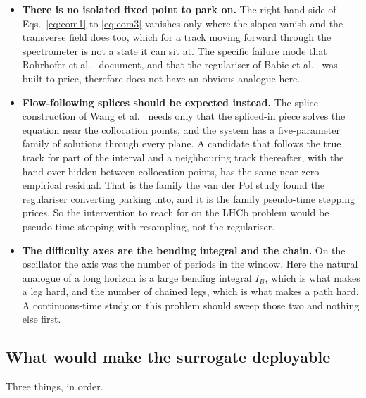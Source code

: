 \documentclass[11pt,a4paper]{article}
\begin{document}
\begin{itemize}
  \item \textbf{There is no isolated fixed point to park on.} The right-hand
  side of Eqs.~\eqref{eq:eom1} to \eqref{eq:eom3} vanishes only where the slopes
  vanish and the transverse field does too, which for a track moving forward
  through the spectrometer is not a state it can sit at. The specific failure
  mode that Rohrhofer et al.~\cite{rohrhofer2023} document, and that the
  regulariser of Babic et al.~\cite{babic2025} was built to price, therefore
  does not have an obvious analogue here.
  \item \textbf{Flow-following splices should be expected instead.} The splice
  construction of Wang et al.~\cite{wang2026pseudo} needs only that the
  spliced-in piece solves the equation near the collocation points, and the
  system has a five-parameter family of solutions through every plane. A
  candidate that follows the true track for part of the interval and a
  neighbouring track thereafter, with the hand-over hidden between collocation
  points, has the same near-zero empirical residual. That is the family the van
  der Pol study found the regulariser converting parking into, and it is the
  family pseudo-time stepping prices. So the intervention to reach for on the
  LHCb problem would be pseudo-time stepping with resampling, not the
  regulariser.
  \item \textbf{The difficulty axes are the bending integral and the chain.} On
  the oscillator the axis was the number of periods in the window. Here the
  natural analogue of a long horizon is a large bending integral $I_B$, which is
  what makes a leg hard, and the number of chained legs, which is what makes a
  path hard. A continuous-time study on this problem should sweep those two and
  nothing else first.
\end{itemize}

\subsection{What would make the surrogate deployable}

Three things, in order.
\end{document}
